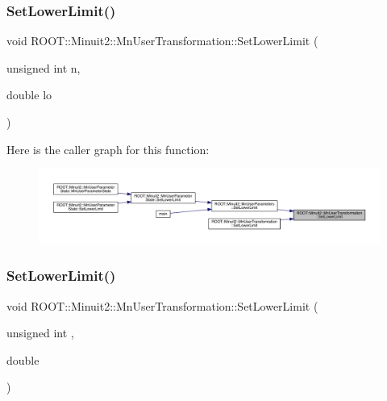 \mbox{\label{classROOT_1_1Minuit2_1_1MnUserTransformation_a380498bdd8801393713fde4a4835402e}} 
\subsubsection{\texorpdfstring{SetLowerLimit()}{SetLowerLimit()}\hspace{0.1cm}{\footnotesize\ttfamily [2/6]}}
{\footnotesize\ttfamily void R\+O\+O\+T\+::\+Minuit2\+::\+Mn\+User\+Transformation\+::\+Set\+Lower\+Limit (\begin{DoxyParamCaption}\item[{unsigned int}]{n,  }\item[{double}]{lo }\end{DoxyParamCaption})}

Here is the caller graph for this function\+:
\nopagebreak
\begin{figure}[H]
\begin{center}
\leavevmode
\includegraphics[width=350pt]{d9/d98/classROOT_1_1Minuit2_1_1MnUserTransformation_a380498bdd8801393713fde4a4835402e_icgraph}
\end{center}
\end{figure}
\mbox{\label{classROOT_1_1Minuit2_1_1MnUserTransformation_a380498bdd8801393713fde4a4835402e}} 
\subsubsection{\texorpdfstring{SetLowerLimit()}{SetLowerLimit()}\hspace{0.1cm}{\footnotesize\ttfamily [3/6]}}
{\footnotesize\ttfamily void R\+O\+O\+T\+::\+Minuit2\+::\+Mn\+User\+Transformation\+::\+Set\+Lower\+Limit (\begin{DoxyParamCaption}\item[{unsigned int}]{,  }\item[{double}]{ }\end{DoxyParamCaption})}

